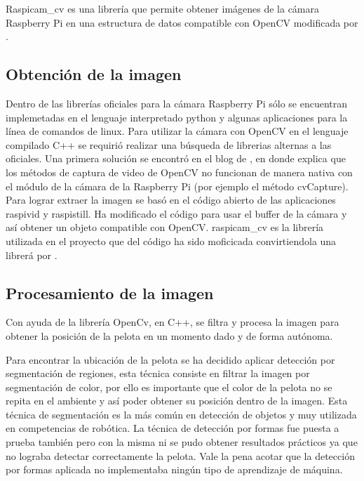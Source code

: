 Raspicam\_cv es una librería que permite obtener im\'agenes de la cámara Raspberry Pi en una estructura de datos compatible con OpenCV  modificada por \cite{emilV}.

\subsection{Obtenci\'on de la imagen}\label{extraerImagen}

Dentro de las librerías oficiales para la cámara Raspberry Pi s\'olo se encuentran implemetadas en el lenguaje interpretado python y algunas aplicaciones para la línea de comandos de linux. Para utilizar la cámara con OpenCV en el lenguaje compilado C++ se requirió realizar una búsqueda de librerias alternas a las oficiales. Una primera solución se encontró en el blog de \cite{pierreR}, en donde explica que los métodos de captura de video de OpenCV no funcionan de manera nativa con el m\'odulo de la cámara de la Raspberry Pi (por ejemplo el método cvCapture). Para lograr extraer la imagen se basó en el código abierto de las aplicaciones raspivid y raspistill. Ha modificado el código para usar el buffer de la cámara y así obtener un objeto compatible con OpenCV. 
raspicam\_cv es la librer\'ia utilizada en el proyecto que del c\'odigo ha sido moficicada convirtiendola una librer\'a por \cite{emilV}.

\subsection{Procesamiento de la imagen}\label{procesarImagen}

Con ayuda de la librería OpenCv, en C++, se filtra y procesa la imagen para obtener la posición de la pelota en un momento dado y de forma autónoma. 

Para encontrar la ubicación de la pelota  se ha decidido aplicar detección por segmentación de regiones, esta técnica consiste en filtrar la imagen por segmentaci\'on de color, por ello es importante que el color de la pelota no se repita en el ambiente y así poder obtener su posición dentro de la imagen. Esta t\'ecnica de segmentaci\'on es la m\'as com\'un en detecci\'on de objetos y muy utilizada en competencias de rob\'otica. La t\'ecnica de detecci\'on por  formas fue puesta a prueba tambi\'en pero con la misma ni se pudo obtener resultados pr\'acticos ya que no lograba detectar correctamente la pelota. Vale la pena acotar que la detecci\'on por formas aplicada no implementaba ning\'un tipo de aprendizaje de m\'aquina.

